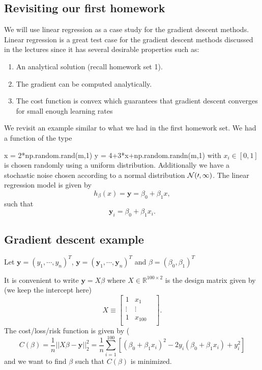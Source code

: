 \documentclass[%
oneside,                 %
final,                   %
10pt]{article}
\begin{document}
\subsection{Revisiting our first homework}

We will use linear regression as a case study for the gradient descent
methods. Linear regression is a great test case for the gradient
descent methods discussed in the lectures since it has several
desirable properties such as:

\begin{enumerate}
\item An analytical solution (recall homework set 1).

\item The gradient can be computed analytically.

\item The cost function is convex which guarantees that gradient descent converges for small enough learning rates
\end{enumerate}

\noindent
We revisit an example similar to what we had in the first homework set. We had a function  of the type

\bpycod
x = 2*np.random.rand(m,1)
y = 4+3*x+np.random.randn(m,1)
\epycod
with $x_i \in [0,1] $ is chosen randomly using a uniform distribution. Additionally we have a stochastic noise chosen according to a normal distribution $\cal {N}(0,1)$. 
The linear regression model is given by 
\[
h_\beta(x) = \bm{y} = \beta_0 + \beta_1 x,
\] 
such that 
\[
\bm{y}_i = \beta_0 + \beta_1 x_i.
\]

\subsection{Gradient descent example}

Let $\mathbf{y} = (y_1,\cdots,y_n)^T$, $\mathbf{\bm{y}} = (\bm{y}_1,\cdots,\bm{y}_n)^T$ and $\beta = (\beta_0, \beta_1)^T$

It is convenient to write $\mathbf{\bm{y}} = X\beta$ where $X \in \mathbb{R}^{100 \times 2} $ is the design matrix given by (we keep the intercept here)
\[
X \equiv \begin{bmatrix}
1 & x_1  \\
\vdots & \vdots  \\
1 & x_{100} &  \\
\end{bmatrix}.
\]
The cost/loss/risk function is given by (
\[
C(\beta) = \frac{1}{n}||X\beta-\mathbf{y}||_{2}^{2} = \frac{1}{n}\sum_{i=1}^{100}\left[ (\beta_0 + \beta_1 x_i)^2 - 2 y_i (\beta_0 + \beta_1 x_i) + y_i^2\right] 
\]
and we want to find $\beta$ such that $C(\beta)$ is minimized.
\end{document}

